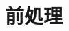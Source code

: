 \documentclass[../main]{subfiles}
\begin{document}
\section{前処理}
\label{sec:pmethod_preprocessing}
\end{document}
